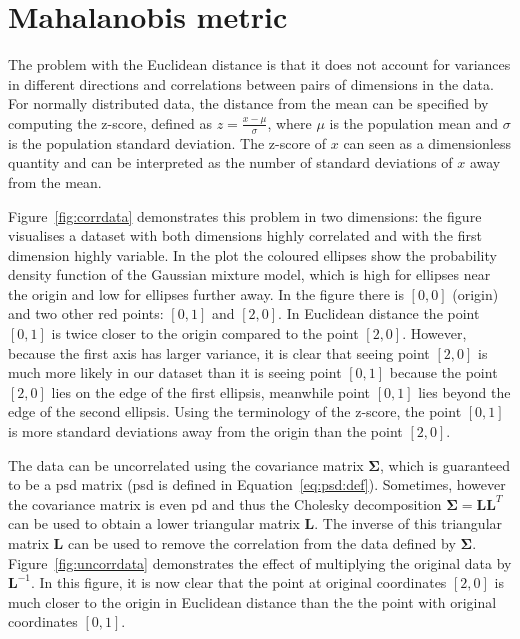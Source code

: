 \documentclass[12pt,a4paper]{report}
\begin{document}

\section{Mahalanobis metric} \label{chap:intro:mah}

The problem with the Euclidean distance is that it does not account for variances in different directions and correlations between pairs of dimensions in the data. For normally distributed data, the distance from the mean can be specified by computing the z-score, defined as $z = \frac{x-\mu}{\sigma}$, where $\mu$ is the population mean and $\sigma$ is the population standard deviation. The z-score of $x$ can seen as a dimensionless quantity and can be interpreted as the number of standard deviations of $x$ away from the mean.

Figure~\ref{fig:corrdata} demonstrates this problem in two dimensions: the figure visualises a dataset with both dimensions highly correlated and with the first dimension highly variable. In the plot the coloured ellipses show the probability density function of the Gaussian mixture model, which is high for ellipses near the origin and low for ellipses further away. In the figure there is $[0,0]$ (origin) and two other red points: $[0,1]$ and $[2,0]$. In Euclidean distance the point $[0,1]$ is twice closer to the origin compared to the point $[2,0]$. However, because the first axis has larger variance, it is clear that seeing point $[2,0]$ is much more likely in our dataset than it is seeing point $[0,1]$ because the point $[2,0]$ lies on the edge of the first ellipsis, meanwhile point $[0,1]$ lies beyond the edge of the second ellipsis. Using the terminology of the z-score, the point $[0,1]$ is more standard deviations away from the origin than the point $[2,0]$.


The data can be uncorrelated using the covariance matrix $\bm{\Sigma}$, which is guaranteed to be a \ac{psd} matrix (\ac{psd} is defined in Equation~\ref{eq:psd:def}). Sometimes, however the covariance matrix is even \ac{pd} and thus the Cholesky decomposition $\bm{\Sigma}=\bm{L}\bm{L}^T$ can be used to obtain a lower triangular matrix $\bm{L}$. The inverse of this triangular matrix $\bm{L}$ can be used to remove the correlation from the data defined by $\bm{\Sigma}$. Figure~\ref{fig:uncorrdata} demonstrates the effect of multiplying the original data by $\bm{L}^{-1}$. In this figure, it is now clear that the point at original coordinates $[2,0]$ is much closer to the origin in Euclidean distance than the the point with original coordinates $[0,1]$.
\end{document}
